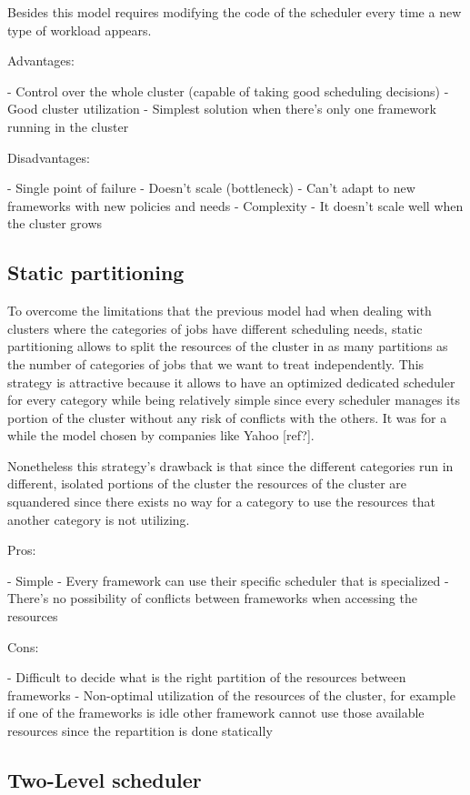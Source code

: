 \documentclass{svjour3}                     %
\begin{document}
Besides this model requires modifying the code of the scheduler every
time a new type of workload appears. 

Advantages:

- Control over the whole cluster (capable of taking good scheduling decisions)
- Good cluster utilization
- Simplest solution when there's only one framework running in the cluster

Disadvantages:

- Single point of failure
- Doesn't scale (bottleneck)
- Can't adapt to new frameworks with new policies and needs
- Complexity
- It doesn't scale well when the cluster grows

\subsection{Static partitioning}

To overcome the limitations that the previous model had when dealing
with clusters where the categories of jobs have different scheduling
needs, static partitioning allows to split the resources of the cluster
in as many partitions as the number of categories of jobs that we want to
treat independently. This strategy is attractive because it allows to
have an optimized dedicated scheduler for every category while being
relatively simple since every scheduler manages its portion of the
cluster without any risk of conflicts with the others. It was
for a while the model chosen by companies like Yahoo [ref?].

Nonetheless this strategy's drawback is that since the different 
categories run in different, isolated portions of the cluster the
resources of the cluster are squandered since there exists no way for
a category to use the resources that another category is not utilizing.

Pros:

- Simple
- Every framework can use their specific scheduler that is specialized
- There's no possibility of conflicts between frameworks when
  accessing the resources

Cons:

- Difficult to decide what is the right partition of the resources
between frameworks
- Non-optimal utilization of the resources of the cluster, for example
if one of the frameworks is idle other framework cannot use those
available resources since the repartition is done statically

\subsection{Two-Level scheduler}
\end{document}
